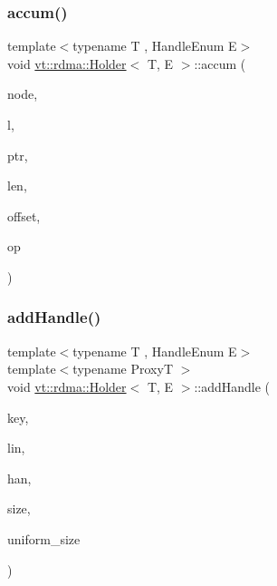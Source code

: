 \subsubsection{\texorpdfstring{accum()}{accum()}}
{\footnotesize\ttfamily template$<$typename T , Handle\+Enum E$>$ \\
void \hyperlink{structvt_1_1rdma_1_1_holder}{vt\+::rdma\+::\+Holder}$<$ T, E $>$\+::accum (\begin{DoxyParamCaption}\item[{\hyperlink{namespacevt_a866da9d0efc19c0a1ce79e9e492f47e2}{vt\+::\+Node\+Type}}]{node,  }\item[{\hyperlink{namespacevt_1_1rdma_ac5c20b41a653e520b6305d4d454ecb70}{Lock}}]{l,  }\item[{T $\ast$}]{ptr,  }\item[{std\+::size\+\_\+t}]{len,  }\item[{int}]{offset,  }\item[{M\+P\+I\+\_\+\+Op}]{op }\end{DoxyParamCaption})}

\mbox{\label{structvt_1_1rdma_1_1_holder_ab5feb3bca7aad2b37c7249f3abf7ab05}} 
\subsubsection{\texorpdfstring{add\+Handle()}{addHandle()}}
{\footnotesize\ttfamily template$<$typename T , Handle\+Enum E$>$ \\
template$<$typename ProxyT $>$ \\
void \hyperlink{structvt_1_1rdma_1_1_holder}{vt\+::rdma\+::\+Holder}$<$ T, E $>$\+::add\+Handle (\begin{DoxyParamCaption}\item[{\hyperlink{structvt_1_1rdma_1_1_handle_key}{Handle\+Key}}]{key,  }\item[{\hyperlink{namespacevt_1_1rdma_a38e310504e675aa1bcaf7811019b0df2}{Elem\+Type}}]{lin,  }\item[{\hyperlink{structvt_1_1rdma_1_1_handle}{Handle}$<$ T, E $>$}]{han,  }\item[{std\+::size\+\_\+t}]{size,  }\item[{bool}]{uniform\+\_\+size }\end{DoxyParamCaption})\hspace{0.3cm}{\ttfamily [private]}}

